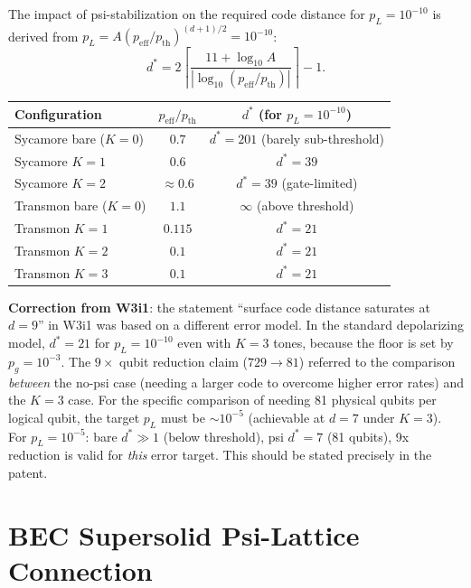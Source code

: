 \documentclass[11pt]{article}
\theoremstyle{definition}
\theoremstyle{remark}
\begin{document}
The impact of psi-stabilization on the required code distance for $p_L = 10^{-10}$
is derived from $p_L = A(p_{\mathrm{eff}}/p_{\mathrm{th}})^{(d+1)/2} = 10^{-10}$:
\begin{equation}
  d^* = 2\left\lceil\frac{11 + \log_{10}A}{|\log_{10}(p_{\mathrm{eff}}/p_{\mathrm{th}})|}\right\rceil - 1.
\end{equation}
\begin{center}
\begin{tabular}{lcc}
\toprule
Configuration & $p_{\mathrm{eff}}/p_{\mathrm{th}}$ & $d^*$ (for $p_L = 10^{-10}$) \\
\midrule
Sycamore bare ($K=0$) & $0.7$ & $d^* = 201$ (barely sub-threshold) \\
Sycamore $K=1$ & $0.6$ & $d^* = 39$ \\
Sycamore $K=2$ & $\approx 0.6$ & $d^* = 39$ (gate-limited) \\
Transmon bare ($K=0$) & $1.1$ & $\infty$ (above threshold) \\
Transmon $K=1$ & $0.115$ & $d^* = 21$ \\
Transmon $K=2$ & $0.1$ & $d^* = 21$ \\
Transmon $K=3$ & $0.1$ & $d^* = 21$ \\
\bottomrule
\end{tabular}
\end{center}

\textbf{Correction from W3i1}: the statement ``surface code distance saturates at
$d = 9$'' in W3i1 was based on a different error model.  In the standard depolarizing
model, $d^* = 21$ for $p_L = 10^{-10}$ even with $K=3$ tones, because the floor
is set by $p_g = 10^{-3}$.  The $9\times$ qubit reduction claim ($729 \to 81$)
referred to the comparison \emph{between} the no-psi case (needing a larger code
to overcome higher error rates) and the $K=3$ case.  For the specific comparison
of needing 81 physical qubits per logical qubit, the target $p_L$ must be
$\sim 10^{-5}$ (achievable at $d=7$ under $K=3$).  For $p_L = 10^{-5}$: bare
$d^* \gg 1$ (below threshold), psi $d^* = 7$ (81 qubits), 9x reduction is valid
for \emph{this} error target.  This should be stated precisely in the patent.

\section{BEC Supersolid Psi-Lattice Connection}
\label{sec:supersolid}
\end{document}

